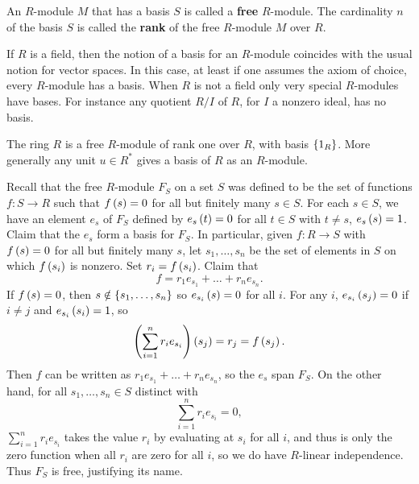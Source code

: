 \begin{definition}
An $ R $-module $ M $ that has a basis $ S $ is called a \textbf{free} $ R $-module. The cardinality $ n $ of the basis $ S $ is called the \textbf{rank} of the free $ R $-module $ M $ over $ R $.
\end{definition}


\begin{remark1}
If $ R $ is a field, then the notion of a basis for an $ R $-module coincides with the usual notion for vector spaces. In this case, at least if one assumes the axiom of choice, every $ R $-module has a basis. When $ R $ is not a field only very special $ R $-modules have bases. For instance any quotient $ R / I $ of $ R $, for $ I $ a nonzero ideal, has no basis.
\end{remark1}

\begin{example2}
The ring $ R $ is a free $ R $-module of rank one over $ R $, with basis $ \left\{ 1_R \right\} $. More generally any unit $ u \in R^* $ gives a basis of $ R $ as an $ R $-module.
\end{example2}

Recall that the free $ R $-module $ F_S $ on a set $ S $ was defined to be the set of functions $ f : S \to R $ such that $ f\left( s \right) = 0 $ for all but finitely many $ s \in S $. For each $ s \in S $, we have an element $ e_s $ of $ F_S $ defined by $ e_s\left( t \right) = 0 $ for all $ t \in S $ with $ t \ne s $, $ e_s\left( s \right) = 1 $. Claim that the $ e_s $ form a basis for $ F_S $. In particular, given $ f : R \to S $ with $ f\left( s \right) = 0 $ for all but finitely many $ s $, let $ s_1, \dots, s_n $ be the set of elements in $ S $ on which $ f\left( s_i \right) $ is nonzero. Set $ r_i = f\left( s_i \right) $. Claim that
$$ f = r_1e_{s_1} + \dots + r_ne_{s_n}. $$
If $ f\left( s \right) = 0 $, then $ s \notin \left\{ s_1, \dots, s_n \right\} $ so $ e_{s_i}\left( s \right) = 0 $ for all $ i $. For any $ i $, $ e_{s_i}\left( s_j \right) = 0 $ if $ i \ne j $ and $ e_{s_i}\left( s_i \right) = 1 $, so
$$ \left( \sum_{i = 1}^n r_ie_{s_i} \right)\left( s_j \right) = r_j = f\left( s_j \right). $$
Then $ f $ can be written as $ r_1e_{s_1} + \dots + r_ne_{s_n} $, so the $ e_s $ span $ F_S $. On the other hand, for all $ s_1, \dots, s_n \in S $ distinct with
$$ \sum_{i = 1}^n r_ie_{s_i} = 0, $$
$ \sum_{i = 1}^n r_ie_{s_i} $ takes the value $ r_i $ by evaluating at $ s_i $ for all $ i $, and thus is only the zero function when all $ r_i $ are zero for all $ i $, so we do have $ R $-linear independence. Thus $ F_S $ is free, justifying its name.

